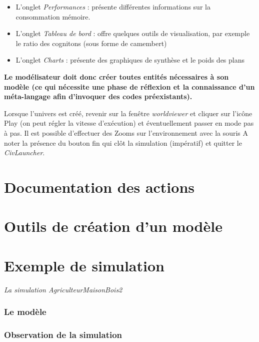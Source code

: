 \documentclass[a4paper,oneside,12 pt]{article}
\begin{document}
\begin{itemize}
\item  L'onglet \textit{Performances} : présente différentes informations sur la consommation mémoire.
\item L'onglet \textit{Tableau de bord} : offre quelques outils de visualisation, par exemple le ratio des cognitons (sous forme de camembert)
\item L'onglet \textit{Charts} : présente des graphiques de synthèse et le poids des plans 

\end{itemize}

\vspace{10mm}

\textbf{Le modélisateur doit donc créer toutes entités nécessaires à son modèle (ce qui nécessite une phase de réflexion et la connaissance d'un méta-langage afin d'invoquer des codes préexistants).}


Lorsque l'univers est créé, revenir sur la fenêtre \textit{worldviewer} et cliquer sur l'icône Play (on peut régler la vitesse d'exécution) et éventuellement passer en mode pas à pas.
Il est possible d'effectuer des Zooms sur l'environnement  avec la souris 
A noter la présence du bouton fin qui clôt la simulation (impératif) et quitter le \textit{CivLauncher}.

\newpage
\part{Documentation des actions}
	
\newpage
\part{Outils de création d'un modèle}
	
\newpage
\part{Exemple de simulation }
\Large{\emph{La simulation AgriculteurMaisonBois2}}
 	\section{Le modèle}
		
		\clearpage
	\section{Observation de la simulation}
		
\end{document}
